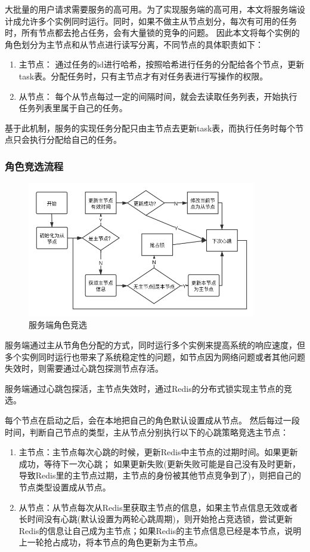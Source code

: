 大批量的用户请求需要服务的高可用。为了实现服务端的高可用，本文将服务端设计成允许多个实例同时运行。同时，如果不做主从节点划分，每次有可用的任务时，所有节点都去抢占任务，会有大量锁的竞争的问题。
因此本文将每个实例的角色划分为主节点和从节点进行读写分离，不同节点的具体职责如下：
\begin{enumerate}
    \item 主节点： 通过任务的id进行哈希，按照哈希进行任务的分配给各个节点，更新task表。分配任务时，只有主节点才有对任务表进行写操作的权限。

    \item 从节点： 每个从节点每过一定的间隔时间，就会去读取任务列表，开始执行任务列表里属于自己的任务。  

\end{enumerate}

基于此机制，服务的实现任务分配只由主节点去更新task表，而执行任务时每个节点只会执行分配给自己的任务。

\subsubsection{角色竞选流程}

\begin{figure}
    \centering
    \includegraphics[width=10cm]{images/slave-master.png}
    \caption{服务端角色竞选}
    \label{fig:slave_master}
\end{figure}

服务端通过主从节角色分配的方式，同时运行多个实例来提高系统的响应速度，但多个实例同时运行也带来了系统稳定性的问题，如节点因为网络问题或者其他问题失效时，则需要通过心跳包探测节点存活。

服务端通过心跳包探活，主节点失效时，通过Redis的分布式锁实现主节点的竞选。

每个节点在启动之后，会在本地把自己的角色默认设置成从节点。
然后每过一段时间，判断自己节点的类型，主从节点分别执行以下的心跳策略竞选主节点：
\begin{enumerate}
    \item 主节点：主节点每次心跳的时候，更新Redis中主节点的过期时间。如果更新成功，等待下一次心跳； 如果更新失败(更新失败可能是自己没有及时更新，导致Redis里的主节点过期，主节点的身份被其他节点竞争到了)，则把自己的节点类型设置成从节点。
    
    \item 从节点：从节点每次从Redis里获取主节点的信息，如果主节点信息无效或者长时间没有心跳(默认设置为两轮心跳周期)，则开始抢占竞选锁，尝试更新Redis的信息让自己成为主节点；如果Redis的主节点信息已经是本节点，说明上一轮抢占成功，将本节点的角色更新为主节点。 
\end{enumerate}


